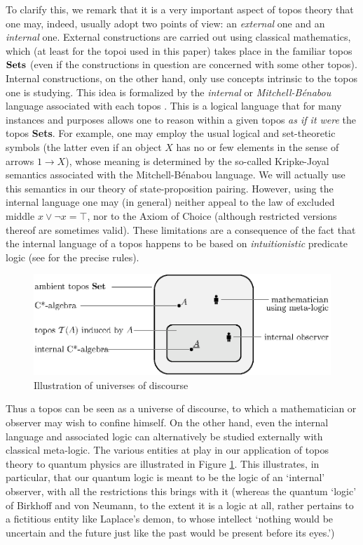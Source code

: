 \documentclass[12pt]{article}
\newcommand{\Sets}{\mbox{\textbf{Sets}}}
\newcommand{\raw}{\rightarrow} \newcommand{\rat}{\mapsto}
\begin{document}
To clarify this, we remark that
it is a very important aspect of topos theory that one may, indeed,  usually
adopt two
points of view: an {\it external} one and an {\it internal} one. External
constructions are carried out using classical mathematics, which (at
least for the topoi used in this paper) takes place in the familiar
topos $\Sets$ (even if the constructions in question are concerned with some
other
topos). Internal constructions, on the other hand, only use concepts
intrinsic to the topos one is studying. This idea is formalized by the {\it
internal}
or {\it Mitchell-B{\'e}nabou} language associated with each topos
\cite{borceux3,johnstone02b,maclanemoerdijk92}. This is a logical language that
for many instances and purposes allows one to reason within a given topos {\it
as if it were} the topos \Sets. For example,
one may employ the usual logical and set-theoretic symbols (the latter even if
an object $X$ has no or few elements in the sense of arrows $1\raw X$), whose
meaning is determined by the so-called Kripke-Joyal semantics associated with
the Mitchell-B{\'e}nabou language. We will actually use this semantics
in our theory of state-proposition pairing. However, using the
internal language one may (in general) neither appeal to the law of
excluded middle $x\vee\neg x=\top$, nor to the Axiom of Choice
(although restricted versions thereof are sometimes valid). These
limitations are a consequence of the fact that the internal language
of a topos happens to be based on {\it intuitionistic} predicate logic
(see  \cite{borceux3,johnstone02b} for the precise rules).

\begin{figure}[t]
  \includegraphics{picture}
  \caption{Illustration of  universes of discourse}
  \label{fig:toposlevels}
\end{figure}

Thus a topos can be seen as a universe of discourse, to which a  mathematician
or
observer may wish  to confine himself. On the other hand, even the internal
language and associated logic  can alternatively be studied externally with
classical
meta-logic. The various entities at play in our application of topos theory to
quantum physics are illustrated in Figure \ref{fig:toposlevels}. This
illustrates, in particular, that our quantum logic is meant to be the logic of
an `internal' observer, with all the restrictions this brings with it (whereas
the quantum `logic' of Birkhoff and von Neumann, to the extent it is a logic at
all, rather pertains to a fictitious entity like
Laplace's demon, to whose intellect `nothing would be uncertain and the future
just like the past would be present before its eyes.')
\end{document}

